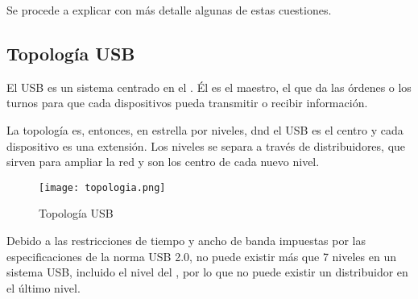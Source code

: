   Se procede a explicar con más detalle algunas de estas cuestiones.

    \subsection{Topología USB}
    El USB es un sistema centrado en el \host. Él es el maestro, el que da las
    órdenes o los turnos para que cada dispositivos pueda transmitir o recibir
    información.

    La topología es, entonces, en estrella por niveles, dnd el \host USB es el
    centro y cada dispositivo es una extensión. Los niveles se separa a través
    de distribuidores, que sirven para ampliar la red y son los centro de cada
    nuevo nivel.

    \begin{figure}
	    \centering
		\texttt{[image: topologia.png]}
		\caption{Topología USB}
		\label{}
    \end{figure}

    Debido a las restricciones de tiempo y ancho de banda impuestas por las
    especificaciones de la norma USB 2.0, no puede existir más que 7 niveles
    en un sistema USB, incluido el nivel del \host, por lo que no puede existir
    un distribuidor en el último nivel.



